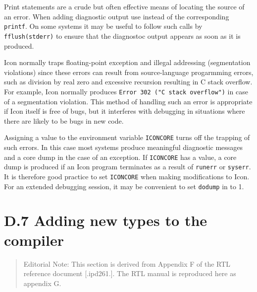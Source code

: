 Print statements are a crude but often effective means of locating the source of
an error. When adding diagnostic output use
\noindent
instead of the corresponding \texttt{printf}. On some systems it may be useful
to follow such calls by \texttt{fflush(stderr)} to ensure that the diagnostoc
output appears as soon as it is produced.

Icon normally traps floating-point exception and illegal addressing
(segmentation violations) since these errors can result from source-language
progarmming errors, such as division by real zero and excessive recursion
resulting in C stack overflow. For example, Icon normally produces
\texttt{Error 302 ("C stack overflow")} in case of a segmentation violation.
This method of handling such an error is appropriate if Icon itself is free of
bugs, but it interferes with debugging in situations where there are likely to
be bugs in new code.

Assigning a value to the environment variable \texttt{ICONCORE} turns off the
trapping of such errors. In this case most systems produce meaningful diagnostic
messages and a core dump in the case of an exception.  If \texttt{ICONCORE} has
a value, a core dump is produced if an Icon program terminates as a result of
\texttt{runerr} or \texttt{syserr}.  It is therefore good practice to set
\texttt{ICONCORE} when making modifications to Icon. For an extended debugging
session, it may be convenient to set \texttt{dodump} in  to 1.

\section{D.7 Adding new types to the compiler}
\newcommand{\toklbra}{\texttt{~~(~~}}%
\newcommand{\tokrbra}{\texttt{~~)~~}}%
\newcommand{\toklcbra}{\texttt{~~\{~~}}%
\newcommand{\tokrcbra}{\texttt{~~\}~~}}%
\newcommand{\toklsbra}{\texttt{~~[~~}}%
\newcommand{\tokrsbra}{\texttt{~~]~~}}%
\newcommand{\tokcolon}{\texttt{~~:~~}}%
\newcommand{\cceq}{{\normalfont~~::=~~}}%
\newenvironment{ebnf}%
{\begin{specialcode}{\itshape}}%
{\end{specialcode}}%

\begin{quote}
Editorial Note: This section is derived from Appendix F of the RTL
reference document [.ipd261.]. The RTL manual is reproduced here as
appendix G.
\end{quote}

